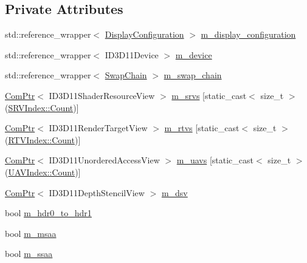 \subsection*{Private Attributes}
\begin{DoxyCompactItemize}
\item 
std\+::reference\+\_\+wrapper$<$ \mbox{\hyperlink{classmage_1_1rendering_1_1_display_configuration}{Display\+Configuration}} $>$ \mbox{\hyperlink{classmage_1_1rendering_1_1_output_manager_a41905bc9eb0426c2e75d33d60bb95fbf}{m\+\_\+display\+\_\+configuration}}
\item 
std\+::reference\+\_\+wrapper$<$ I\+D3\+D11\+Device $>$ \mbox{\hyperlink{classmage_1_1rendering_1_1_output_manager_ad0f8b4613dfbd613576a3c58c8ff4c37}{m\+\_\+device}}
\item 
std\+::reference\+\_\+wrapper$<$ \mbox{\hyperlink{classmage_1_1rendering_1_1_swap_chain}{Swap\+Chain}} $>$ \mbox{\hyperlink{classmage_1_1rendering_1_1_output_manager_ac9cffc724a38ffd3d9b49475fd29d3ba}{m\+\_\+swap\+\_\+chain}}
\item 
\mbox{\hyperlink{namespacemage_ae74f374780900893caa5555d1031fd79}{Com\+Ptr}}$<$ I\+D3\+D11\+Shader\+Resource\+View $>$ \mbox{\hyperlink{classmage_1_1rendering_1_1_output_manager_ac002667bd25dd978d6ff0ece782c8455}{m\+\_\+srvs}} \mbox{[}static\+\_\+cast$<$ size\+\_\+t $>$(\mbox{\hyperlink{classmage_1_1rendering_1_1_output_manager_a941f1b35a83ee0ce190494523ec0fe63ae93f994f01c537c4e2f7d8528c3eb5e9}{S\+R\+V\+Index\+::\+Count}})\mbox{]}
\item 
\mbox{\hyperlink{namespacemage_ae74f374780900893caa5555d1031fd79}{Com\+Ptr}}$<$ I\+D3\+D11\+Render\+Target\+View $>$ \mbox{\hyperlink{classmage_1_1rendering_1_1_output_manager_afd0aade15fe5b0f9f4f0bef9f7ea3715}{m\+\_\+rtvs}} \mbox{[}static\+\_\+cast$<$ size\+\_\+t $>$(\mbox{\hyperlink{classmage_1_1rendering_1_1_output_manager_af9caebb7e9cacf454d26b827a01e857cae93f994f01c537c4e2f7d8528c3eb5e9}{R\+T\+V\+Index\+::\+Count}})\mbox{]}
\item 
\mbox{\hyperlink{namespacemage_ae74f374780900893caa5555d1031fd79}{Com\+Ptr}}$<$ I\+D3\+D11\+Unordered\+Access\+View $>$ \mbox{\hyperlink{classmage_1_1rendering_1_1_output_manager_abfdf92e89ef4ee4df40204e84098fdd7}{m\+\_\+uavs}} \mbox{[}static\+\_\+cast$<$ size\+\_\+t $>$(\mbox{\hyperlink{classmage_1_1rendering_1_1_output_manager_a71b3797fef957312f92736f15b7ada3eae93f994f01c537c4e2f7d8528c3eb5e9}{U\+A\+V\+Index\+::\+Count}})\mbox{]}
\item 
\mbox{\hyperlink{namespacemage_ae74f374780900893caa5555d1031fd79}{Com\+Ptr}}$<$ I\+D3\+D11\+Depth\+Stencil\+View $>$ \mbox{\hyperlink{classmage_1_1rendering_1_1_output_manager_a48225f5d17db8e3d0e44adc2689d326f}{m\+\_\+dsv}}
\item 
bool \mbox{\hyperlink{classmage_1_1rendering_1_1_output_manager_aee20394757c9f7ebcaf7f8682747d716}{m\+\_\+hdr0\+\_\+to\+\_\+hdr1}}
\item 
bool \mbox{\hyperlink{classmage_1_1rendering_1_1_output_manager_a3affee412b093ea168b9e4a22c713421}{m\+\_\+msaa}}
\item 
bool \mbox{\hyperlink{classmage_1_1rendering_1_1_output_manager_ae0016fada4d4550d58481d2c313ea524}{m\+\_\+ssaa}}
\end{DoxyCompactItemize}


